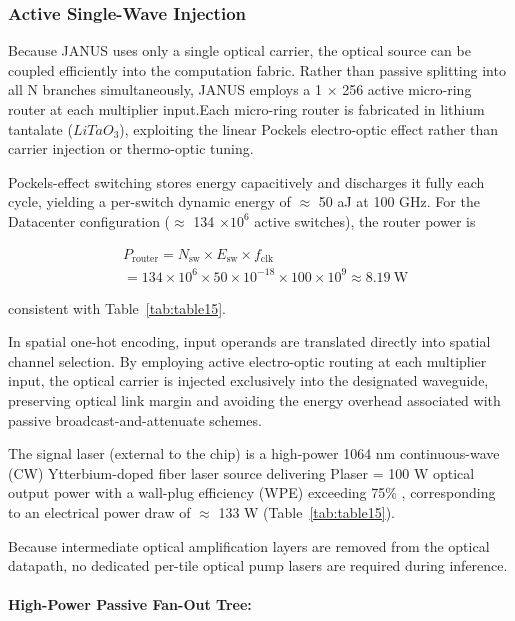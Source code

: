 \documentclass[journal]{IEEEtran}
\begin{document}
\subsubsection{\textbf{Active Single-Wave Injection}}

Because JANUS uses only a single optical carrier, the optical source can be coupled efficiently into the computation fabric. Rather than passive splitting into all N branches simultaneously, JANUS employs a 1 $\times$ 256 active micro-ring router at each multiplier input.Each micro-ring router is fabricated in lithium tantalate ($LiTaO_3$), exploiting the linear Pockels electro-optic effect rather than carrier injection or thermo-optic tuning. 

Pockels-effect switching stores energy capacitively and discharges it fully each cycle, yielding a per-switch dynamic energy of $\approx$ 50 aJ at 100 GHz. For the Datacenter configuration ($\approx$ 134 $\times 10^{6}$ active switches), the router power is 

\begin{equation}
\begin{aligned}
& P_{\mathrm{router}} = N_{\mathrm{sw}} \times E_{\mathrm{sw}} \times f_{\mathrm{clk}} \\
& = 134 \times 10^{6} \times 50 \times 10^{-18}
\times 100 \times 10^{9} \approx 8.19~\mathrm{W}
\end{aligned}
\end{equation}

consistent with Table~\ref{tab:table15}.

In spatial one-hot encoding, input operands are translated directly into spatial channel selection. By employing active electro-optic routing at each multiplier input, the optical carrier is injected exclusively into the designated waveguide, preserving optical link margin and avoiding the energy overhead associated with passive broadcast-and-attenuate schemes.

The signal laser (external to the chip) is a high-power 1064 nm continuous-wave (CW) Ytterbium-doped fiber laser source delivering Plaser = 100 W optical output power with a wall-plug efficiency (WPE) exceeding 75\% \cite{Jeong2004}, corresponding to an electrical power draw of $\approx$ 133 W (Table~\ref{tab:table15}). 

Because intermediate optical amplification layers are removed from the optical datapath, no dedicated per-tile optical pump lasers are required during inference.

\paragraph{\textbf{High-Power Passive Fan-Out Tree:}}
\end{document}
